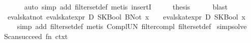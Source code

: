 \begin{isabellebody}
\ \ \ \ \isamarkupfalse%
\ {}auto\ simp\ add{}\ filter{}set{}def{}\ metis\ insertI{}{}\isanewline
\ \ \isamarkupfalse%
\ \isamarkupfalse%
\ {}thesis\isanewline
\ \ \ \ \isamarkupfalse%
\ blast\isanewline
{}\isamarkupfalse%
%
\endisatagproof
{\isafoldproof}%
%
\isadelimproof
\isanewline
%
\endisadelimproof
\isanewline
{}\isamarkupfalse%
\ eval{}skat{}not{}\ {}eval{}skat{}expr\ D\ {}SKBool\ {}BNot\ x{}{}\ {}\ {}\ {}{}\ eval{}skat{}expr\ D\ {}SKBool\ x{}\ {}\ {}\ {}{}{}\isanewline
%
\isadelimproof
\ \ %
\endisadelimproof
%
\isatagproof
{}\isamarkupfalse%
\ {}simp\ add{}\ filter{}set{}def{}\ metis\ Compl{}UN\ filter{}compl\ filter{}set{}def{}%
\endisatagproof
{\isafoldproof}%
%
\isadelimproof
\isanewline
%
\endisadelimproof
%
\isadelimML
\isanewline
%
\endisadelimML
%
\isatagML
{}\isamarkupfalse%
\ simp{}solve\ {}\ {}\isanewline
Scan{}succeed\ {}fn\ ctxt\ {}{}\isanewline

\end{isabellebody}
